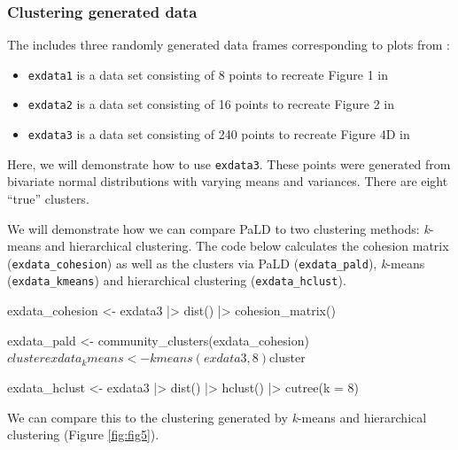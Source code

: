 \hypertarget{clustering-generated-data}{%
\subsubsection{Clustering generated
data}\label{clustering-generated-data}}

The  includes three randomly generated data frames
corresponding to plots from \citet{berenhaut2022social}:

\begin{itemize}
\tightlist
\item
  \texttt{exdata1} is a data set consisting of 8 points to recreate
  Figure 1 in \citet{berenhaut2022social}
\item
  \texttt{exdata2} is a data set consisting of 16 points to recreate
  Figure 2 in \citet{berenhaut2022social}
\item
  \texttt{exdata3} is a data set consisting of 240 points to recreate
  Figure 4D in \citet{berenhaut2022social}
\end{itemize}

Here, we will demonstrate how to use \texttt{exdata3}. These points were
generated from bivariate normal distributions with varying means and
variances. There are eight ``true'' clusters.

We will demonstrate how we can compare PaLD to two clustering methods:
\emph{k}-means and hierarchical clustering. The code below calculates
the cohesion matrix (\texttt{exdata\_cohesion}) as well as the clusters
via PaLD (\texttt{exdata\_pald}), \emph{k}-means
(\texttt{exdata\_kmeans}) and hierarchical clustering
(\texttt{exdata\_hclust}).

\begin{Schunk}
\begin{Sinput}
exdata_cohesion <- exdata3 |>
  dist() |>
  cohesion_matrix()

exdata_pald <- community_clusters(exdata_cohesion)$cluster

exdata_kmeans <- kmeans(exdata3, 8)$cluster

exdata_hclust <- exdata3 |>
  dist() |>
  hclust() |>
  cutree(k = 8) 
\end{Sinput}
\end{Schunk}

We can compare this to the clustering generated by \emph{k}-means and
hierarchical clustering (Figure \ref{fig:fig5}).

